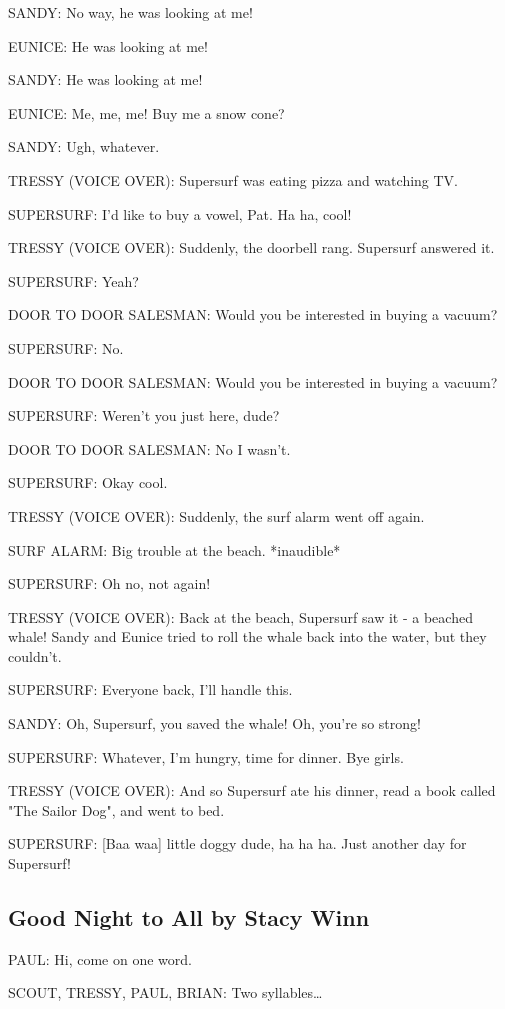 SANDY:
No way, he was looking at me!

EUNICE:
He was looking at me!

SANDY:
He was looking at me!

EUNICE:
Me, me, me!
Buy me a snow cone?

SANDY:
Ugh, whatever.

TRESSY (VOICE OVER):
Supersurf was eating pizza and watching TV.

SUPERSURF:
I'd like to buy a vowel, Pat.
Ha ha, cool!

TRESSY (VOICE OVER):
Suddenly, the doorbell rang. Supersurf answered it.

SUPERSURF:
Yeah?

DOOR TO DOOR SALESMAN:
Would you be interested in buying a vacuum?

SUPERSURF:
No.

DOOR TO DOOR SALESMAN:
Would you be interested in buying a vacuum?

SUPERSURF:
Weren't you just here, dude?

DOOR TO DOOR SALESMAN:
No I wasn't.

SUPERSURF:
Okay cool.

TRESSY (VOICE OVER):
Suddenly, the surf alarm went off again.

SURF ALARM:
Big trouble at the beach. *inaudible*

SUPERSURF:
Oh no, not again!

TRESSY (VOICE OVER):
Back at the beach, Supersurf saw it - a beached whale!
Sandy and Eunice tried to roll the whale back into the water, but they couldn't.

SUPERSURF:
Everyone back, I'll handle this.

SANDY:
Oh, Supersurf, you saved the whale!
Oh, you're so strong!

SUPERSURF:
Whatever, I'm hungry, time for dinner.
Bye girls.

TRESSY (VOICE OVER):
And so Supersurf ate his dinner, read a book called "The Sailor Dog", and went to bed.

SUPERSURF:
[Baa waa] little doggy dude, ha ha ha.
Just another day for Supersurf!

\subsection{Good Night to All by Stacy Winn}

PAUL:
Hi, come on one word.

SCOUT, TRESSY, PAUL, BRIAN:
Two syllables\dots

